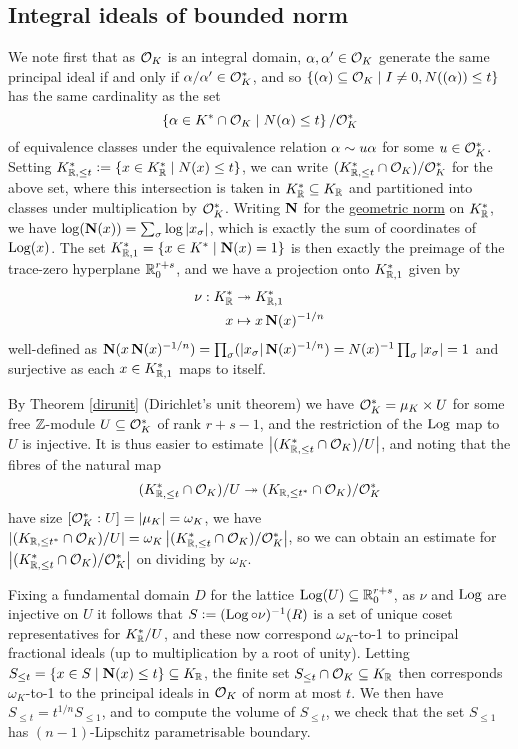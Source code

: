 \documentclass[11pt]{report}
\begin{document}
\subsection{Integral ideals of bounded norm}
We note first that as $\mathcal{O}_K$ is an integral domain, $\alpha, \alpha' \in \mathcal{O}_K$ generate the same principal ideal if and only if $\alpha/\alpha' \in \mathcal{O}_K^*$, and so $\left\{  (\alpha) \subseteq \mathcal{O}_K \mid I \neq 0, N((\alpha)) \leq t  \right\}$ has the same cardinality as the set 
$$
    \left\{  \alpha \in K^* \cap \mathcal{O}_K \mid N(\alpha) \leq t  \right\} / \mathcal{O}_K^*
$$
of equivalence classes under the equivalence relation $\alpha \sim u\alpha$ for some $u \in \mathcal{O}_K^*$. Setting $K_{\mathbb{R}, \leq t}^* \vcentcolon= \left\{  x \in K_{\mathbb{R}}^* \mid N(x) \leq t  \right\}$, we can write $(K_{\mathbb{R}, \leq t}^* \cap \mathcal{O}_K) / \mathcal{O}_K^*$ for the above set, where this intersection is taken in $K_{\mathbb{R}}^* \subseteq K_{\mathbb{R}}$ and partitioned into classes under multiplication by $\mathcal{O}_K^*$. Writing $\operatorname{\mathbf{N}}$ for the \hyperlink{geomnorm}{geometric norm} on $K_{\mathbb{R}}^*$, we have $\log(\operatorname{\mathbf{N}}(x)) = \sum_{\sigma} \log\left| x_\sigma \right|$, which is exactly the sum of coordinates of $\operatorname{Log}(x)$. The set $K_{\mathbb{R}, 1}^* = \left\{  x \in K^* \mid \operatorname{\mathbf{N}}(x) = 1  \right\}$ is then exactly the preimage of the trace-zero hyperplane $\mathbb{R}^{r + s}_0$, and we have a projection onto $K_{\mathbb{R}, 1}^*$ given by
\begin{align*}
    \nu : K_{\mathbb{R}}^* &\twoheadrightarrow K_{\mathbb{R}, 1}^* \\
    x &\mapsto x\operatorname{\mathbf{N}}(x)^{-1/n}
\end{align*}
well-defined as $\operatorname{\mathbf{N}}(x\operatorname{\mathbf{N}}(x)^{-1/n}) = \prod_{\sigma} (\left| x_\sigma \right|\operatorname{\mathbf{N}}(x)^{-1/n}) = N(x)^{-1}\prod_{\sigma}\left| x_\sigma \right| = 1$ and surjective as each $x \in K_{\mathbb{R}, 1}^*$ maps to itself.

By Theorem \ref{dirunit} (Dirichlet's unit theorem) we have $\mathcal{O}_K^* = \mu_K \times U$ for some free $\mathbb{Z}$-module $U \subseteq \mathcal{O}_K^*$ of rank $r + s - 1$, and the restriction of the $\operatorname{Log}$ map to $U$ is injective. It is thus easier to estimate $\left| (K_{\mathbb{R}, \leq t}^* \cap \mathcal{O}_K) / U \right|$, and noting that the fibres of the natural map 
$$
    (K_{\mathbb{R}, \leq t}^* \cap \mathcal{O}_K) / U \twoheadrightarrow (K_{\mathbb{R}, \leq t^*} \cap \mathcal{O}_K) / \mathcal{O}_K^*
$$
have size $[\mathcal{O}_K^* : U] = \left| \mu_K \right| = \omega_K$, we have $\left| (K_{\mathbb{R}, \leq t^*} \cap \mathcal{O}_K) / U \right| = \omega_K\left| (K_{\mathbb{R}, \leq t}^* \cap \mathcal{O}_K) / \mathcal{O}_K^* \right|$, so we can obtain an estimate for $\left| (K_{\mathbb{R}, \leq t}^* \cap \mathcal{O}_K) / \mathcal{O}_K^* \right|$ on dividing by $\omega_K$. 

Fixing a fundamental domain $D$ for the lattice $\operatorname{Log}(U) \subseteq \mathbb{R}^{r + s}_0$, as $\nu$ and $\operatorname{Log}$ are injective on $U$ it follows that $S \vcentcolon= (\operatorname{Log} \circ \nu)^{-1}(R)$ is a set of unique coset representatives for $K_{\mathbb{R}}^* / U$,  and these now correspond $\omega_K$-to-1 to principal fractional ideals (up to multiplication by a root of unity). Letting $S_{\leq t} = \left\{  x \in S \mid \operatorname{\mathbf{N}}(x) \leq t  \right\} \subseteq K_{\mathbb{R}}$, the finite set $S_{\leq t} \cap \mathcal{O}_K \subseteq K_{\mathbb{R}}$ then corresponds $\omega_K$-to-1 to the principal ideals in $\mathcal{O}_K$ of norm at most $t$. We then have $S_{\leq t} = t^{1/n}S_{\leq 1}$, and to compute the volume of $S_{\leq t}$, we check that the set $S_{\leq 1}$ has $(n - 1)$-Lipschitz parametrisable boundary.
\end{document}
